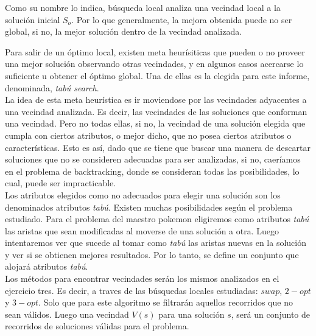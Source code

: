 Como su nombre lo indica, búsqueda local analiza una vecindad local a la solución inicial $S_o$. Por lo que generalmente, la mejora obtenida puede no ser global, si no, la mejor solución dentro de la vecindad analizada. 

Para salir de un óptimo local, existen meta heurísiticas que pueden o no proveer una mejor solución observando otras vecindades, y en algunos casos acercarse lo suficiente u obtener el óptimo global. Una de ellas es la elegida para este informe, denominada, \textit{tab\'u search}.\\

La idea de esta meta heurística es ir moviendose por las vecindades adyacentes a una vecindad analizada. Es decir, las vecindades de las soluciones que conforman una vecindad.
Pero no todas ellas, si no, la vecindad de una solución elegida que cumpla con ciertos atributos, o mejor dicho, que no posea ciertos atributos o características. 
Esto es así, dado que se tiene que buscar una manera de descartar soluciones que no se consideren adecuadas para ser analizadas, si no, caeríamos en el problema de backtracking, donde se consideran todas las posibilidades, lo cual, puede ser impracticable.\\

Los atributos elegidos como no adecuados para elegir una solución son los denominados atributos \textit{tab\'u}. Existen muchas posibilidades según el problema estudiado. Para el problema del maestro pokemon eligiremos como atributos \textit{tabú} las aristas que sean modificadas al moverse de una solución a otra. Luego intentaremos ver que sucede al tomar como \textit{tabú} las aristas nuevas en la solución y ver si se obtienen mejores resultados.
Por lo tanto, se define un conjunto que alojará atributos \textit{tabú}.\\

Los métodos para encontrar vecindades serán los mismos analizados en el ejercicio tres. Es decir, a traves de las búsquedas locales estudiadas: $swap$, $2-opt$ y $3-opt$. Solo que para este algoritmo se filtrarán aquellos recorridos que no sean válidos. Luego una vecindad $V(s)$ para una solución $s$, será un conjunto de recorridos de soluciones válidas para el problema.\\

